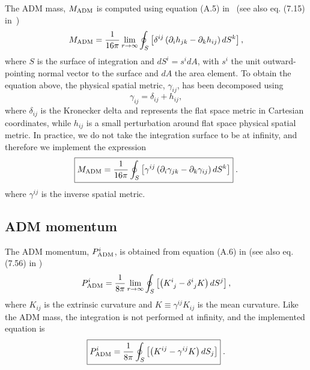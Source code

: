 The ADM mass, $M_{\rm ADM}$ is computed using equation (A.5) in~\cite{alcubierre2008introduction}
(see also eq. (7.15) in~\cite{gourgoulhon20073+})
\begin{equation}
M_{\rm ADM} = \frac{1}{16\pi}\lim_{r\to\infty}\oint_{S}\left[
  \delta^{ij}\left(\partial_{i}h_{jk} - \partial_{k}h_{ij}\right)dS^{k}
  \right],
\end{equation}
where $S$ is the surface of integration and $dS^{i} = s^{i}dA$, with
$s^{i}$ the unit outward-pointing normal vector to the surface and
$dA$ the area element. To obtain the equation above, the physical
spatial metric, $\gamma_{ij}$, has been decomposed using
\begin{equation}
\gamma_{ij} = \delta_{ij} + h_{ij},
\end{equation}
where $\delta_{ij}$ is the Kronecker delta and represents the flat
space metric in Cartesian coordinates, while $h_{ij}$ is a small
perturbation around flat space physical spatial metric. In practice,
we do not take the integration surface to be at infinity, and therefore
we implement the expression
\begin{equation}
\boxed{
M_{\rm ADM} = \frac{1}{16\pi}\oint_{S}\left[
  \gamma^{ij}\left(\partial_{i}\gamma_{jk} - \partial_{k}\gamma_{ij}\right)dS^{k}
  \right]
}\; .
\end{equation}
where $\gamma^{ij}$ is the inverse spatial metric.

\subsection{ADM momentum}
\label{sec:ADM_momentum_integral}

The ADM momentum, $P_{\rm ADM}^{i}$, is obtained from equation (A.6) in
\cite{alcubierre2008introduction} (see also eq. (7.56) in
\cite{gourgoulhon20073+})
\begin{equation}
P_{\rm ADM}^{i} = \frac{1}{8\pi}\lim_{r\to\infty}\oint_{S}\left[
  \left(K^{i}_{\ j}-\delta^{i}_{\ j}K\right)dS^{j}
  \right],
\end{equation}
where $K_{ij}$ is the extrinsic curvature and $K\equiv\gamma^{ij}K_{ij}$
is the mean curvature. Like the ADM mass, the integration is not performed
at infinity, and the implemented equation is
\begin{equation}
\boxed{
P_{\rm ADM}^{i} = \frac{1}{8\pi}\oint_{S}\left[
  \left(K^{ij}-\gamma^{ij}K\right)dS_{j}
  \right]
}\; .
\end{equation}

